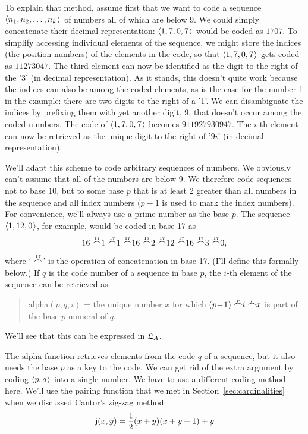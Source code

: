 To explain that method,
assume first that
we want to code a sequence $\t{n_{1}, n_{2}, \ldots, n_{k}}$ of numbers
all of which are below 9.
We could simply
concatenate their decimal representation:
$\t{1,7,0,7}$ would be coded as $1707$.
To simplify accessing individual elements of the sequence,
we might store the indices (the position numbers) of the elements in the code,
so that $\t{1,7,0,7}$ gets coded as $11273047$.
The third element can now be identified as the digit to the right of the '3'
(in decimal representation).
As it stands,
this doesn't quite work because the indices can also be among the coded elements,
as is the case for the number 1 in the example:
there are two digits to the right of a '1'.
We can disambiguate the indices by prefixing them with yet another digit, 9,
that doesn't occur among the coded numbers.
The code of $\t{1,7,0,7}$ becomes $911927930947$.
The $i$-th element can now be retrieved as the unique digit to the right of '$9i$'
(in decimal representation).

We'll adapt this scheme to code arbitrary sequences of numbers.
We obviously can't assume that all of the numbers are below 9.
We therefore code sequences not to base 10,
but to some base $p$ that is at least 2 greater than
all numbers in the sequence and all index numbers
($p\!-\!1$ is used to mark the index numbers).
For convenience,
we'll always use a prime number as the base $p$.
The sequence $\t{1, 12, 0}$,
for example,
would be coded in base 17 as
\[
  16 \pconcatseventeen 1 \pconcatseventeen 1 \pconcatseventeen 16 \pconcatseventeen 2 \pconcatseventeen 12 \pconcatseventeen 16 \pconcatseventeen 3 \pconcatseventeen 0,
\]
where `$\pconcatseventeen$' is the operation of concatenation in base 17.
(I'll define this formally below.)
If $q$ is the code number of a sequence in base $p$,
the $i$-th element of the sequence can be retrieved as
\begin{quote}
  $\mathrm{alpha}(p,q,i)$ = the unique number $x$ for which $(p\!-\!1) \pconcat i \pconcat x$ is part of the base-$p$ numeral of $q$.
\end{quote}
We'll see that this can be expressed in $\mathfrak{L}_{A}$.

The $\mathrm{alpha}$ function retrieves elements from the code $q$ of a sequence,
but it also needs the base $p$ as a key to the code.
We can get rid of the extra argument
by coding $\t{p,q}$ into a single number.
We have to use a different coding method here.
We'll use the pairing function that we met in Section~\ref{sec:cardinalities}
when we discussed Cantor's zig-zag method:
\[
   \mathrm{j}(x,y) = \frac{\mbox{\small 1}}{\mbox{\small 2}} (x+y)(x+y+1)+y
\]

